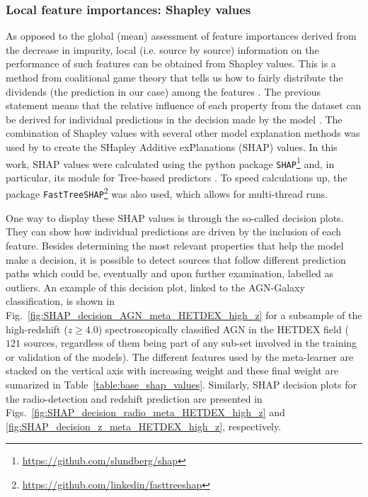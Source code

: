 \documentclass{aa}
\begin{document}
\subsubsection{Local feature importances: Shapley values}\label{sec:shapley_values}

As opposed to the global (mean) assessment of feature importances derived from the decrease in impurity, local (i.e. source by source) information on the performance of such features can be obtained from Shapley values. This is a method from coalitional game theory that tells us how to fairly distribute the dividends (the prediction in our case) among the features \citep{Shapley_article}. The previous statement means that the relative influence of each property from the dataset can be derived for individual predictions in the decision made by the model \citep[which is not the same as obtaining causal correlations between features and the target;][]{2020arXiv200805052M}. 
The combination of Shapley values with several other model explanation methods  was used by \citet[][]{NIPS2017_7062} to create the SHapley Additive exPlanations (SHAP) values. In this work, SHAP values were calculated using the python package \verb|SHAP|\footnote{\url{https://github.com/slundberg/shap}} and, in particular, its module for Tree-based predictors \citep{lundberg2020local2global}.
To speed calculations up, the package \verb|FastTreeSHAP|\footnote{\url{https://github.com/linkedin/fasttreeshap}} \citep[\texttt{v0.1.2};][]{2021arXiv210909847Y} was also used, which allows for multi-thread runs. 

One way to display these SHAP values is through the so-called decision plots. They can show how individual predictions are driven by the inclusion of each feature. Besides determining the most relevant properties that help the model make a decision, it is possible to detect sources that follow different prediction paths which could be, eventually and upon further examination, labelled as outliers. An example of this decision plot, linked to the AGN-Galaxy classification, is shown in Fig.~\ref{fig:SHAP_decision_AGN_meta_HETDEX_high_z} for a subsample of the high-redshift (${z \geq 4.0}$) spectroscopically classified AGN in the HETDEX field ($121$ sources, regardless of them being part of any sub-set involved in the training or validation of the models). The different features used by the meta-learner are stacked on the vertical axis with increasing weight and these final weight are sumarized in Table~\ref{table:base_shap_values}. Similarly, SHAP decision plots for the radio-detection and redshift prediction are presented in Figs.~\ref{fig:SHAP_decision_radio_meta_HETDEX_high_z} and \ref{fig:SHAP_decision_z_meta_HETDEX_high_z}, respectively.
\end{document}
